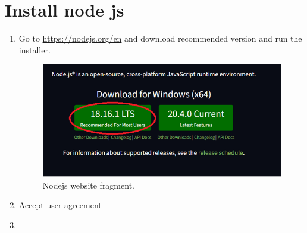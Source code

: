 \documentclass[a4paper,12pt]{book}
\begin{document}
\section{Install node js}
\begin{enumerate}
	\item Go to \url{https://nodejs.org/en} and download recommended version and run the installer.
	\begin{figure}[H]
		\centering
		\includegraphics{nodejs_install}
		\caption{Nodejs website fragment.}
	\end{figure}
	\item \begin{minipage}[t]{\linewidth}
		\raggedright
		\medskip	
	\end{minipage}
	Accept user agreement
	\item \begin{minipage}[t]{\linewidth}
		\raggedright
\end{minipage}
\end{enumerate}
\end{document}
